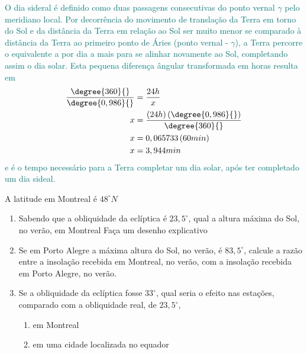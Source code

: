 \begin{sol}
	\textcolor{teal} { 
		O dia sideral é definido como duas passagens consecutivas do ponto vernal $\gamma$ pelo meridiano local. Por decorrência do movimento de translação da Terra em torno do Sol e da distância da Terra em relação ao Sol ser muito menor se comparado à distância da Terra ao primeiro ponto de Áries (ponto vernal - $\gamma$), a Terra percorre o equivalente a  por dia a mais para se alinhar novamente ao Sol, completando assim o dia solar. Esta pequena diferença ângular transformada em horas resulta em
		\begin{align}
			\frac{\degree{360}{}}{\degree{0,986}{}}&=\frac{24h}{x}\nonumber \\
			x&=\frac{\left(24h\right)\left(\degree{0,986}{}\right)}{\degree{360}{}}\nonumber \\
			x&=0,065733\left(60min\right)\nonumber \\
			x&=3,944min
		\end{align}
		e é o tempo necessário para a Terra completar um dia solar, após ter completado um dia sideal.
	}
\end{sol}
\begin{prob}
	A latitude em Montreal é $48^{\circ}N$
	\begin{enumerate}[label=\alph *)]
		\item Sabendo que a obliquidade da eclíptica é $23,5^{\circ}$, qual a altura máxima do Sol, no verão, em Montreal Faça um desenho explicativo
		\item Se em Porto Alegre a máxima altura do Sol, no verão, é $83,5^{\circ}$, calcule a razão entre a insolação recebida em Montreal, no verão, com a insolação recebida em Porto Alegre, no	verão.
		\item Se a obliquidade da eclíptica fosse $33^{\circ}$, qual seria o efeito nas estações, comparado com a obliquidade real, de $23,5^{\circ}$,
		\begin{enumerate}[label=\alph{enumi}.\roman{enumii})]
			\item em Montreal
			\item em uma cidade localizada no equador
		\end{enumerate}				
	\end{enumerate}
\end{prob}

